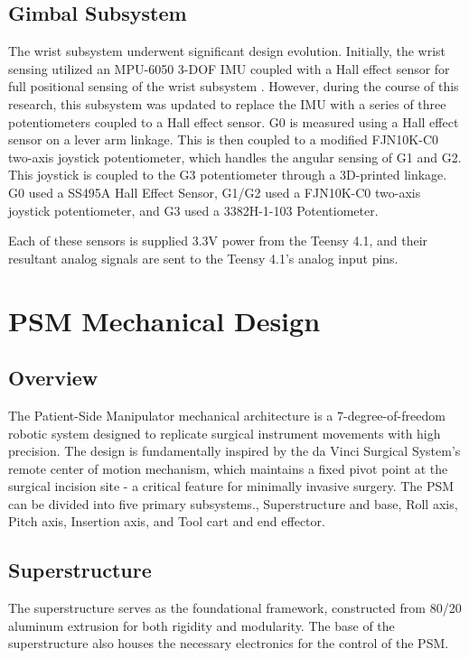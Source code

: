 \subsection{Gimbal Subsystem}
The wrist subsystem underwent significant design evolution. Initially, the wrist sensing utilized an MPU-6050 3-DOF IMU coupled with a Hall effect sensor for full positional sensing of the wrist subsystem \cite{Preiss2022Haptically}. However, during the course of this research, this subsystem was updated to replace the IMU with a series of three potentiometers coupled to a Hall effect sensor. G0 is measured using a Hall effect sensor on a lever arm linkage. This is then coupled to a modified FJN10K-C0 two-axis joystick potentiometer, which handles the angular sensing of G1 and G2. This joystick is coupled to the G3 potentiometer through a 3D-printed linkage. G0 used a SS495A Hall Effect Sensor, G1/G2 used a FJN10K-C0 two-axis joystick potentiometer, and G3 used a 3382H-1-103 Potentiometer.

Each of these sensors is supplied 3.3V power from the Teensy 4.1, and their resultant analog signals are sent to the Teensy 4.1's analog input pins.

\section{PSM Mechanical Design}

\subsection{Overview}
The Patient-Side Manipulator mechanical architecture is a 7-degree-of-freedom robotic system designed to replicate surgical instrument movements with high precision. The design is fundamentally inspired by the da Vinci Surgical System's remote center of motion mechanism, which maintains a fixed pivot point at the surgical incision site - a critical feature for minimally invasive surgery. The PSM can be divided into five primary subsystems., Superstructure and base, Roll axis, Pitch axis, Insertion axis, and Tool cart and end effector.

\subsection{Superstructure}
The superstructure serves as the foundational framework, constructed from 80/20 aluminum extrusion for both rigidity and modularity. The base of the superstructure also houses the necessary electronics for the control of the PSM. 

